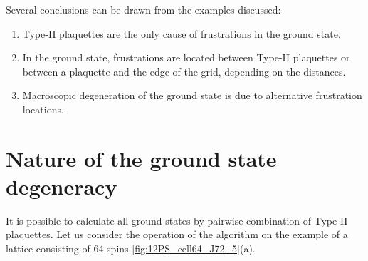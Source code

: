 \documentclass[utf8, babel, sor, jor, amsmath, amssymb, reprint]{elsarticle} %
\begin{document}
Several conclusions can be drawn from the examples discussed:

\begin{enumerate}
	\item Type-II plaquettes are the only cause of frustrations in the ground state.
	\item In the ground state, frustrations are located between Type-II plaquettes or between a plaquette and the edge of the grid, depending on the distances.
	\item Macroscopic degeneration of the ground state is due to alternative frustration locations.
\end{enumerate}

\section{Nature of the ground state degeneracy}

It is possible to calculate all ground states by pairwise combination of Type-II plaquettes. Let us consider the operation of the algorithm on the example of a lattice consisting of 64 spins \ref{fig:12PS_cell64_J72_5}(a).
\end{document}
